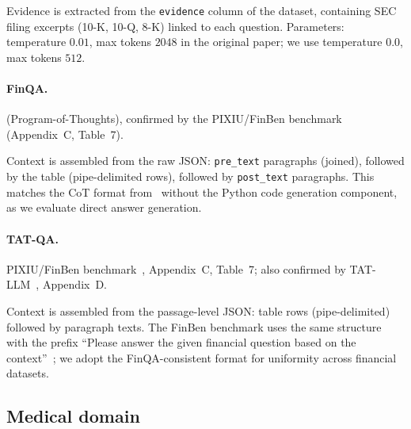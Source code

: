 Evidence is extracted from the \texttt{evidence} column of the
dataset, containing SEC filing excerpts (10-K, 10-Q, 8-K) linked to
each question. Parameters: temperature $0.01$, max tokens $2048$ in
the original paper; we use temperature $0.0$, max tokens $512$.

\paragraph{FinQA.}
\citet{chen2022program} (Program-of-Thoughts), confirmed by the
PIXIU/FinBen benchmark~\cite{xie2024finben} (Appendix~C, Table~7).


Context is assembled from the raw JSON: \texttt{pre\_text} paragraphs
(joined), followed by the table (pipe-delimited rows), followed by
\texttt{post\_text} paragraphs. This matches the CoT format
from~\cite{chen2022program} without the Python code generation
component, as we evaluate direct answer generation.

\paragraph{TAT-QA.}
PIXIU/FinBen benchmark~\cite{xie2024finben}, Appendix~C, Table~7; also
confirmed by TAT-LLM~\cite{zhu2024tatllm}, Appendix~D.


Context is assembled from the passage-level JSON: table rows
(pipe-delimited) followed by paragraph texts. The FinBen benchmark
uses the same structure with the prefix \enquote{Please answer the given
financial question based on the context}~\cite{xie2024finben}; we
adopt the FinQA-consistent format for uniformity across financial
datasets.

\subsection{Medical domain}


